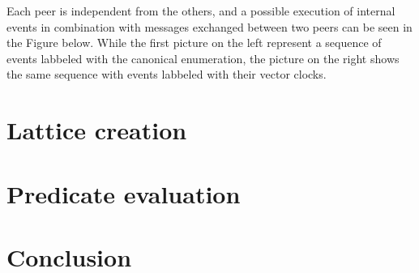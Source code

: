 \documentclass[10pt]{article}
\begin{document}


\noindent
Each peer is independent from the others, and a possible execution of internal events in combination with messages exchanged between two peers can be seen in the Figure below. While the first picture on the left represent a sequence of events labbeled with the canonical enumeration, the picture on the right shows the same sequence with events labbeled with their vector clocks.

\begin{figure}[ht]
	\centering
	\begin{minipage}{.5\textwidth}
	  \scalebox{.8}{}
	\end{minipage}%
	\begin{minipage}{.5\textwidth}
	  \scalebox{.8}{}
	\end{minipage}
\end{figure}

\section{Lattice creation}

\section{Predicate evaluation}

\section{Conclusion}



\end{document}
